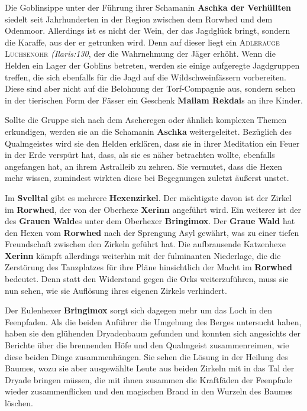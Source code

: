 \newpage

Die Goblinsippe unter der Führung ihrer Schamanin \textbf{Aschka der Verhüllten} siedelt seit Jahrhunderten in der Region zwischen dem Rorwhed und dem Odenmoor.
Allerdings ist es nicht der Wein, der das Jagdglück bringt, sondern die Karaffe, aus der er getrunken wird.
Denn auf dieser liegt ein \textsc{Adlerauge Luchsenohr}  \emph{(Ilaris:130}, der die Wahrnehmung der Jäger erhöht.
Wenn die Helden ein Lager der Goblins betreten, werden sie einige aufgeregte Jagdgruppen treffen, die sich ebenfalls für die Jagd auf die Wildschweinfässern vorbereiten.
Diese sind aber nicht auf die Belohnung der Torf-Compagnie aus, sondern sehen in der tierischen Form der Fässer ein Geschenk \textbf{Mailam Rekdai}s an ihre Kinder.

Sollte die Gruppe sich nach dem Ascheregen oder ähnlich komplexen Themen erkundigen, werden sie an die Schamanin \textbf{Aschka} weitergeleitet.
Bezüglich des Qualmgeistes wird sie den Helden erklären, dass sie in ihrer Meditation ein Feuer in der Erde verspürt hat, dass, als sie es näher betrachten wollte, ebenfalls angefangen hat, an ihrem Astralleib zu zehren.
Sie vermutet, dass die Hexen mehr wissen, zumindest wirkten diese bei Begegnungen zuletzt äußerst unstet.


\neuespalte

Im \textbf{Svelltal} gibt es mehrere \textbf{Hexenzirkel}. Der mächtigste davon ist der Zirkel im \textbf{Rorwhed}, der von der Oberhexe \textbf{Xerinn} angeführt wird.
Ein weiterer ist der des \textbf{Grauen Wald}es unter dem Oberhexer \textbf{Bringimox}.
Der \textbf{Graue Wald} hat den Hexen vom \textbf{Rorwhed} nach der Sprengung Asyl gewährt, was zu einer tiefen Freundschaft zwischen den Zirkeln geführt hat.
Die aufbrausende Katzenhexe \textbf{Xerinn} kämpft allerdings weiterhin mit der fulminanten Niederlage, die die Zerstörung des Tanzplatzes für ihre Pläne hinsichtlich der Macht im \textbf{Rorwhed} bedeutet.
Denn statt den Widerstand gegen die Orks weiterzuführen, muss sie nun sehen, wie sie Auflösung ihres eigenen Zirkels verhindert.

Der Eulenhexer \textbf{Bringimox} sorgt sich dagegen mehr um das Loch in den Feenpfaden.
Als die beiden Anführer die Umgebung des Berges untersucht haben, haben sie den glühenden Dryadenbaum gefunden und konnten sich angesichts der Berichte über die brennenden Höfe und den Qualmgeist zusammenreimen, wie diese beiden Dinge zusammenhängen.
Sie sehen die Lösung in der Heilung des Baumes, wozu sie aber ausgewählte Leute aus beiden Zirkeln mit in das Tal der Dryade bringen müssen, die mit ihnen zusammen die Kraftfäden der Feenpfade wieder zusammenflicken und den magischen Brand in den Wurzeln des Baumes löschen.

